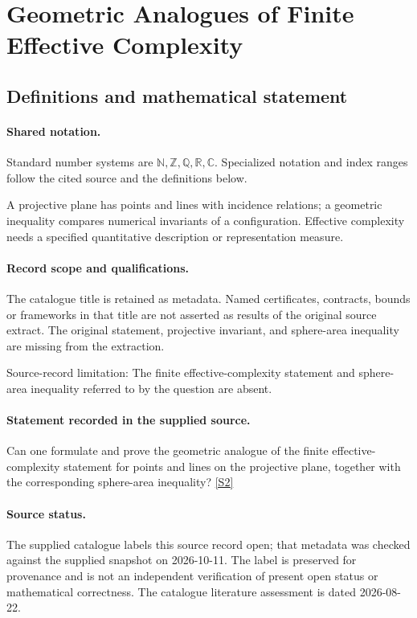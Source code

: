 \documentclass[11pt]{article}
\newcommand{\sref}[2]{\hyperlink{source:#1:#2}{[S#2]}}
\begin{document}
\section{Geometric Analogues of Finite Effective Complexity}\label{statement}

\subsection{Definitions and mathematical statement}

\paragraph{Shared notation.}Standard number systems are $\mathbb N,\mathbb Z,\mathbb Q,\mathbb R,\mathbb C$. Specialized notation and index ranges follow the cited source and the definitions below.


A projective plane has points and lines with incidence relations; a geometric inequality compares numerical invariants of a configuration. Effective complexity needs a specified quantitative description or representation measure.
\paragraph{Record scope and qualifications.}
The catalogue title is retained as metadata. Named certificates, contracts, bounds or frameworks in that title are not asserted as results of the original source extract.
The original statement, projective invariant, and sphere-area inequality are missing from the extraction.

Source-record limitation: The finite effective-complexity statement and sphere-area inequality referred to by the question are absent.
\paragraph{Statement recorded in the supplied source.}
Can one formulate and prove the geometric analogue of the finite effective-complexity statement for points and lines on the projective plane, together with the corresponding sphere-area inequality? \sref{statement}{2}
\paragraph{Source status.}
The supplied catalogue labels this source record open; that metadata was checked against the supplied snapshot on 2026-10-11. The label is preserved for provenance and is not an independent verification of present open status or mathematical correctness. The catalogue literature assessment is dated 2026-08-22.
\end{document}
